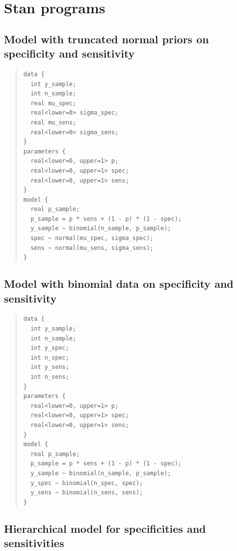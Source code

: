 \documentclass[11pt]{article}
\begin{document}
  \pagebreak
  \appendix

  \section{Stan programs}

  \subsection{Model with truncated normal priors on specificity and sensitivity}\label{stan1}

  \vspace{-\baselineskip}
  \begin{small}
  \begin{quotation}\noindent
\begin{verbatim}
data {
  int y_sample;
  int n_sample;
  real mu_spec;
  real<lower=0> sigma_spec;
  real mu_sens;
  real<lower=0> sigma_sens;
}
parameters {
  real<lower=0, upper=1> p;
  real<lower=0, upper=1> spec;
  real<lower=0, upper=1> sens;
}
model {
  real p_sample;
  p_sample = p * sens + (1 - p) * (1 - spec);
  y_sample ~ binomial(n_sample, p_sample);
  spec ~ normal(mu_spec, sigma_spec);
  sens ~ normal(mu_sens, sigma_sens);
}
\end{verbatim}
\end{quotation}
\end{small}

  \subsection{Model with binomial data on specificity and sensitivity}\label{stan2}

  \vspace{-\baselineskip}
  \begin{small}
  \begin{quotation}\noindent
\begin{verbatim}
data {
  int y_sample;
  int n_sample;
  int y_spec;
  int n_spec;
  int y_sens;
  int n_sens;
}
parameters {
  real<lower=0, upper=1> p;
  real<lower=0, upper=1> spec;
  real<lower=0, upper=1> sens;
}
model {
  real p_sample;
  p_sample = p * sens + (1 - p) * (1 - spec);
  y_sample ~ binomial(n_sample, p_sample);
  y_spec ~ binomial(n_spec, spec);
  y_sens ~ binomial(n_sens, sens);
}
\end{verbatim}
\end{quotation}
\end{small}

\subsection{Hierarchical model for specificities and sensitivities}\label{stan3}
\end{document}
